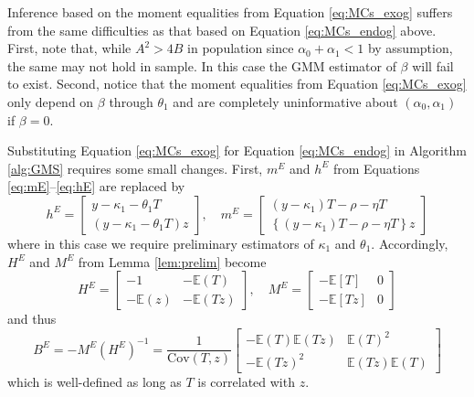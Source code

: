 Inference based on the moment equalities from Equation \ref{eq:MCs_exog} suffers from the same difficulties as that based on Equation \ref{eq:MCs_endog} above.
First, note that, while $A^2 > 4B$ in population since $\alpha_0 + \alpha_1 <1$ by assumption, the same may not hold in sample.
In this case the GMM estimator of $\beta$ will fail to exist.
Second, notice that the moment equalities from Equation \ref{eq:MCs_exog} only depend on $\beta$ through $\theta_1$ and are completely uninformative about $(\alpha_0, \alpha_1)$ if $\beta = 0$.

Substituting Equation \ref{eq:MCs_exog} for Equation \ref{eq:MCs_endog} in Algorithm \ref{alg:GMS} requires some small changes.
First, $m^E$ and $h^E$ from Equations \ref{eq:mE}--\ref{eq:hE} are replaced by 
\[
 h^E = \left[
 \begin{array}{c}
   y - \kappa_1 - \theta_1 T \\
   (y - \kappa_1 - \theta_1 T) z
 \end{array}
 \right], \quad
  m^E = \left[
  \begin{array}{c}
    (y - \kappa_1)T - \rho - \eta T\\
    \left\{(y - \kappa_1)T - \rho - \eta T\right\}z
  \end{array}
\right]
\]
where in this case we require preliminary estimators of $\kappa_1$ and $\theta_1$.
Accordingly, $H^E$ and $M^E$ from Lemma \ref{lem:prelim} become
\[
  H^E = \left[
\begin{array}{cc}
  -1 & -\mathbb{E}(T)\\
  -\mathbb{E}(z) & -\mathbb{E}(Tz)
\end{array}
\right], \quad
  M^E = \left[
\begin{array}{cc}
  -\mathbb{E}[T] & 0 \\
  -\mathbb{E}[Tz] & 0
\end{array}
\right]
\]
and thus
\[
  B^E = -M^E (H^E)^{-1} = 
\frac{1}{\mbox{Cov}(T,z)} \left[
\begin{array}{cc}
  -\mathbb{E}(T)\mathbb{E}(Tz) & \mathbb{E}(T)^2 \\
  -\mathbb{E}(Tz)^2 & \mathbb{E}(Tz) \mathbb{E}(T)
\end{array}
\right]
\]
which is well-defined as long as $T$ is correlated with $z$.

